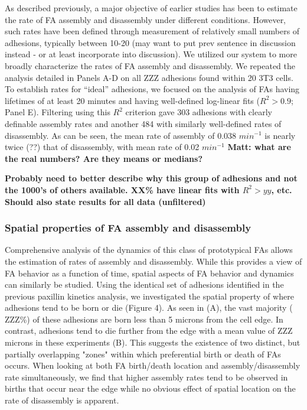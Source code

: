 \documentclass[10pt]{article}
\begin{document}
As described previously, a major objective of earlier studies has been to
estimate the rate of FA assembly and disassembly under different conditions.
However, such rates have been defined through measurement of relatively small
numbers of adhesions, typically between 10-20 (may want to put prev sentence in
discussion instead - or at least incorporate into discussion). We utilized our
system to more broadly characterize the rates of FA assembly and disassembly. We
repeated the analysis detailed in Panels A-D on all ZZZ adhesions found within
20 3T3 cells. To establish rates for ``ideal'' adhesions, we focused on the
analysis of FAs having lifetimes of at least 20 minutes and having well-defined
log-linear fits ($R^2 > 0.9$; Panel E). Filtering using this $R^2$ criterion
gave 303 adhesions with clearly definable assembly rates and another 484 with
similarly well-defined rates of disassembly. As can be seen, the mean rate of
assembly of 0.038 $min^{-1}$ is nearly twice (??) that of disassembly, with mean
rate of 0.02 $min^{-1}$ \textbf{Matt: what are the real numbers? Are they means
or medians?} 

\textbf{Probably need to better describe why this group of adhesions and not the
1000's of others available. XX\% have linear fits with $R^2 > yy$, etc. Should
also state results for all data (unfiltered)} 

\subsubsection*{Spatial properties of FA assembly and disassembly}

Comprehensive analysis of the dynamics of this class of prototypical FAs allows
the estimation of rates of assembly and disassembly. While this provides a view
of FA behavior as a function of time, spatial aspects of FA behavior and
dynamics can similarly be studied. Using the identical set of adhesions
identified in the previous paxillin kinetics analysis, we investigated the
spatial property of where adhesions tend to be born or die (Figure 4). As seen
in (A), the vast majority (~ ZZZ\%) of these adhesions are born less than 5
microns from the cell edge. In contrast, adhesions tend to die further from the
edge with a mean value of ZZZ microns in these experiments (B). This suggests
the existence of two distinct, but partially overlapping "zones" within which
preferential birth or death of FAs occurs. When looking at both FA birth/death
location and assembly/disassembly rate simultaneously, we find that higher
assembly rates tend to be observed in births that occur near the edge while no
obvious effect of spatial location on the rate of disassembly is apparent. 
\end{document}
